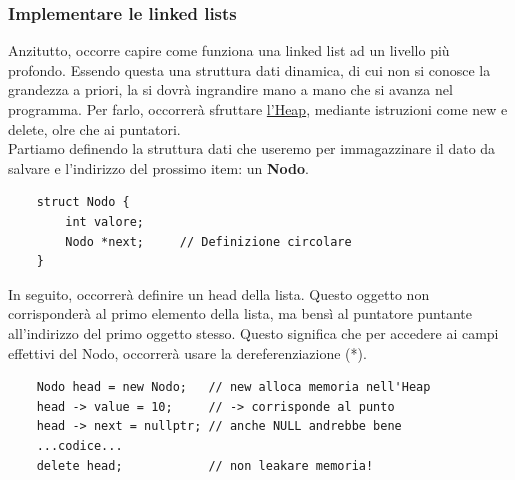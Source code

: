 \documentclass[12pt]{article}
\begin{document}
\subsubsection{Implementare le linked lists}
\label{sssec:linked_lists_implement}
Anzitutto, occorre capire come funziona una linked list ad un livello più profondo.
Essendo questa una struttura dati dinamica, di cui non si conosce la grandezza a priori, la si dovrà ingrandire mano a mano che si avanza nel programma.
Per farlo, occorrerà sfruttare \hyperref[sec:HEAP_STACK]{l'Heap}, mediante istruzioni come new e delete, olre che ai puntatori.
\\
Partiamo definendo la struttura dati che useremo per immagazzinare il dato da salvare e l'indirizzo del prossimo item: un \textbf{Nodo}.
\begin{lstlisting}
    struct Nodo {
        int valore;
        Nodo *next;     // Definizione circolare
    }
\end{lstlisting}
In seguito, occorrerà definire un head della lista.
Questo oggetto non corrisponderà al primo elemento della lista, ma bensì al puntatore puntante all'indirizzo del primo oggetto stesso.
Questo significa che per accedere ai campi effettivi del Nodo, occorrerà usare la dereferenziazione (*).
\begin{lstlisting}
    Nodo head = new Nodo;   // new alloca memoria nell'Heap
    head -> value = 10;     // -> corrisponde al punto
    head -> next = nullptr; // anche NULL andrebbe bene
    ...codice...
    delete head;            // non leakare memoria!
\end{lstlisting}
\end{document}
